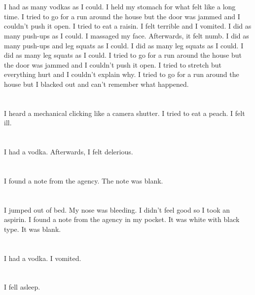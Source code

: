 \documentclass{article}
\begin{document}
    \section{}
    I had as many vodkas as I could. I held my stomach for what felt like a long time. I tried to go for a run around the house but the door was jammed and I couldn't push it open. I tried to eat a raisin. I felt terrible and I vomited.  I did as many push-ups as I could.  I massaged my face. Afterwards, it felt numb.  I did as many push-ups and leg squats as I could.  I did as many leg squats as I could.   I did as many leg squats as I could.  I tried to go for a run around the house but the door was jammed and I couldn't push it open.  I tried to stretch but everything hurt and I couldn't explain why.  I tried to go for a run around the house but I blacked out and can't remember what happened.  
    \newpage
    
    \section{}
    I heard a mechanical clicking like a camera shutter. I tried to eat a peach. I felt ill.  
    \newpage
    
    \section{}
    I had a vodka. Afterwards, I felt delerious.  
    \newpage
    
    \section{}
    I found a note from the agency. The note was blank.  
    \newpage
    
    \section{}
    I jumped out of bed. My nose was bleeding. I didn't feel good so I took an aspirin. I found a note from the agency in my pocket. It was white with black type. It was blank.  
    \newpage
    
    \section{}
    I had a vodka. I vomited.  
    \newpage
    
    \section{}
    I fell asleep.\\\\ 
    \newpage
    
\end{document}
